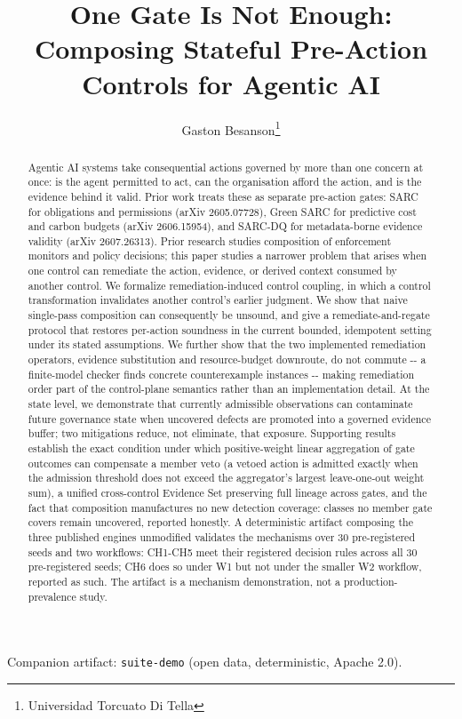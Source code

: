 \documentclass[11pt,a4paper]{article}
\title{One Gate Is Not Enough: Composing Stateful Pre-Action Controls for Agentic AI}
\author{Gaston Besanson\thanks{Universidad Torcuato Di Tella}}
\date{}
\theoremstyle{definition}
\begin{document}
\maketitle

\noindent Companion artifact: \texttt{suite-demo} (open data, deterministic, Apache 2.0).

\begin{abstract}
Agentic AI systems take consequential actions governed by more than one concern at once: is the agent permitted to act, can the organisation afford the action, and is the evidence behind it valid. Prior work treats these as separate pre-action gates: SARC for obligations and permissions (arXiv 2605.07728), Green SARC for predictive cost and carbon budgets (arXiv 2606.15954), and SARC-DQ for metadata-borne evidence validity (arXiv 2607.26313). Prior research studies composition of enforcement monitors and policy decisions; this paper studies a narrower problem that arises when one control can remediate the action, evidence, or derived context consumed by another control. We formalize remediation-induced control coupling, in which a control transformation invalidates another control's earlier judgment. We show that naive single-pass composition can consequently be unsound, and give a remediate-and-regate protocol that restores per-action soundness in the current bounded, idempotent setting under its stated assumptions. We further show that the two implemented remediation operators, evidence substitution and resource-budget downroute, do not commute -{}- a finite-model checker finds concrete counterexample instances -{}- making remediation order part of the control-plane semantics rather than an implementation detail. At the state level, we demonstrate that currently admissible observations can contaminate future governance state when uncovered defects are promoted into a governed evidence buffer; two mitigations reduce, not eliminate, that exposure. Supporting results establish the exact condition under which positive-weight linear aggregation of gate outcomes can compensate a member veto (a vetoed action is admitted exactly when the admission threshold does not exceed the aggregator's largest leave-one-out weight sum), a unified cross-control Evidence Set preserving full lineage across gates, and the fact that composition manufactures no new detection coverage: classes no member gate covers remain uncovered, reported honestly. A deterministic artifact composing the three published engines unmodified validates the mechanisms over 30 pre-registered seeds and two workflows: CH1-CH5 meet their registered decision rules across all 30 pre-registered seeds; CH6 does so under W1 but not under the smaller W2 workflow, reported as such. The artifact is a mechanism demonstration, not a production-prevalence study.
\end{abstract}
\end{document}
